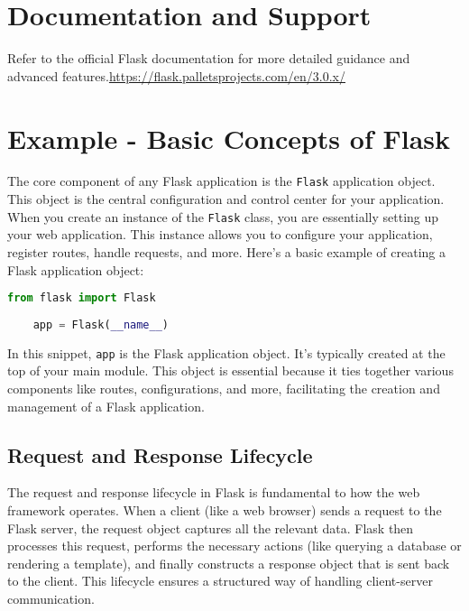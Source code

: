 \section*{Documentation and Support}

Refer to the official Flask documentation for more detailed guidance and advanced features.\url{https://flask.palletsprojects.com/en/3.0.x/}


\section{Example - Basic Concepts of Flask}

The core component of any Flask application is the \texttt{Flask} application object. This object is the central configuration and control center for your application. When you create an instance of the \texttt{Flask} class, you are essentially setting up your web application. This instance allows you to configure your application, register routes, handle requests, and more. Here’s a basic example of creating a Flask application object:

\begin{lstlisting}[language=Python]
	from flask import Flask
	
	app = Flask(__name__)
\end{lstlisting}

In this snippet, \texttt{app} is the Flask application object. It’s typically created at the top of your main module. This object is essential because it ties together various components like routes, configurations, and more, facilitating the creation and management of a Flask application.

\subsection{Request and Response Lifecycle}
The request and response lifecycle in Flask is fundamental to how the web framework operates. When a client (like a web browser) sends a request to the Flask server, the request object captures all the relevant data. Flask then processes this request, performs the necessary actions (like querying a database or rendering a template), and finally constructs a response object that is sent back to the client. This lifecycle ensures a structured way of handling client-server communication.

